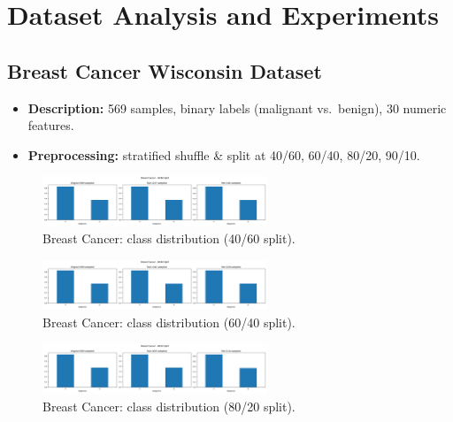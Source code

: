 \section{Dataset Analysis and Experiments}

\subsection{Breast Cancer Wisconsin Dataset}
\begin{itemize}
	\item \textbf{Description:} 569 samples, binary labels (malignant vs.\ benign), 30 numeric features.
	\item \textbf{Preprocessing:} stratified shuffle \& split at 40/60, 60/40, 80/20, 90/10.
\end{itemize}

\begin{figure}[H]
	\centering
	\includegraphics[width=0.6\textwidth]{imgs/class_dist/class_dist__breast_cancer__40_vs_60.png}
	\caption{Breast Cancer: class distribution (40/60 split).}
	\label{fig:bc-cd-40-60}
\end{figure}

\begin{figure}[H]
	\centering
	\includegraphics[width=0.6\textwidth]{imgs/class_dist/class_dist__breast_cancer__60_vs_40.png}
	\caption{Breast Cancer: class distribution (60/40 split).}
	\label{fig:bc-cd-60-40}
\end{figure}

\begin{figure}[H]
	\centering
	\includegraphics[width=0.6\textwidth]{imgs/class_dist/class_dist__breast_cancer__80_vs_20.png}
	\caption{Breast Cancer: class distribution (80/20 split).}
	\label{fig:bc-cd-80-20}
\end{figure}

